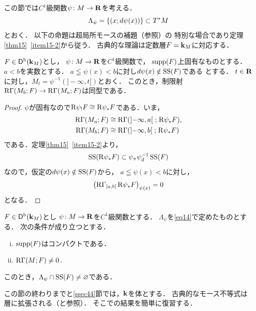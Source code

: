 この節では\(C^1\)級関数\(\psi\colon M\to\rr\)を考える．
\begin{equation}\label{eq14}
    \Lambda_{\psi}=\left\{(x;d\psi(x))\right\}\subset\cotb[M]
\end{equation}
とおく．
以下の命題は超局所モースの補題（\cite[系5.4.19]{KS90}参照）の
特別な場合であり定理\ref{thm15}~\eqref{item15-2}から従う．
古典的な理論は定数層\(F=\kk_M\)に対応する．
\begin{PRP}\label{prp18}
    \(F\in\Dompb(\kk_M)\)とし，
    \(\psi\colon M\to\rr\)を\(C^1\)級関数で，
    \(\supp(F)\)上固有なものとする．
    \(a<b\)を実数とする．
    \(a\leqq \psi(x)<b\)に対し\(d\psi(x)\notin\muS(F)\)である
    とする．
    \(t\in\rr\)に対し，\(M_t=\psi^{-1}(]-\infty,t[)\)とおく．
    このとき，制限射\(\RG(M_b;F)\to\RG(M_a;F)\)は同型である．
\end{PRP}
\begin{proof}
    \(\psi\)が固有なので\(
        \Rder{\psi_{!}}F\cong\Rder{\psi_{\ast}}F
    \)である．いま，
    \begin{align*}
        \RG(M_a;F)&\cong\RG({\left]-\infty,a\right[}\mathrel{;}\Rder{\psi_{\ast}}F),\\
        \RG(M_b;F)&\cong\RG({\left]-\infty,b\right[}\mathrel{;}\Rder{\psi_{\ast}}F)        
    \end{align*}
    である．定理\ref{thm15}~\eqref{item15-2}より，
    \[
        \muS(\Rder{\psi_{\ast}}F)
        \subset
        \mpb[\psi]\mdiff[\psi]^{-1}\muS(F)
    \]
    なので，仮定の\(d\psi(x)\notin\muS(F)\)から，
    \(a\leqq\psi(x)<b\)に対し，
    \[
        \left(\RG_{[a,b[}\Rder{\psi_{\ast}}F\right)_{\psi(x)}=0
    \]
    となる．
\end{proof}
\begin{CRL}\label{cor19}
    \(F\in\Dompb(\kk_M)\)とし
    \(\psi\colon M\to\rr\)を\(C^1\)級関数とする．
    \(\Lambda_\psi\)を\eqref{eq14}で定めたものとする．
    次の条件が成り立つとする．
    \begin{enumerate}[(i)]
        \item \(\supp(F)\)はコンパクトである．
        \item \(\RG(M;F)\ne0\).
    \end{enumerate}
    このとき，\(\Lambda_{\psi}\cap\muS(F)\ne\varnothing\)である．
\end{CRL}

この節の終わりまでと\ref{ssec44}節では，\(\kk\)を体とする．
古典的なモース不等式は
層に拡張される（\cite{ST92}と\cite[命題5.4.20]{KS90}参照）．
そこでの結果を簡単に復習する．

